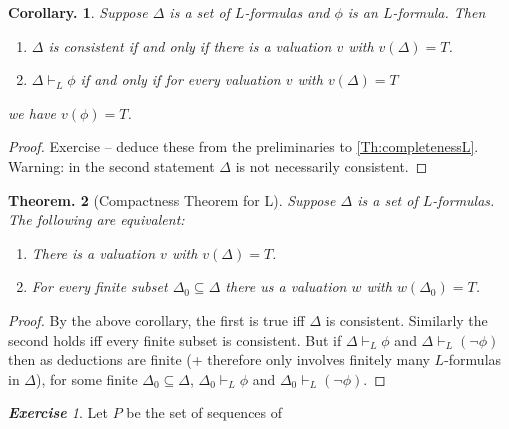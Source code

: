 \documentclass[a4paper,oneside,11pt,DIV=12,parskip=half]{scrartcl}
\theoremstyle{plain}
\newtheorem{theorem}{Theorem.}[section]
\newtheorem{corollary}[theorem]{Corollary.}
\theoremstyle{definition}
\newtheorem{remark, definition}[theorem]{Remark and Definition.}
\newtheorem{lemma, definition}[theorem]{Lemma and Definition.}
\newtheorem{theorem, definition}[theorem]{Theorem and Definition.}
\theoremstyle{remark}
\newtheorem*{exercise}{\textbf{Exercise}}
\newtheorem*{remark, example}{\textbf{Remark and Exercise}}
\begin{document}
\begin{corollary}
 Suppose $\Delta$ is a set of $L$-formulas and $\phi$ is an $L$-formula. Then
 \begin{enumerate}
     \item $\Delta$ is consistent if and only if there is a valuation $v$ with $v(\Delta) =T$.
     \item $\Delta \vdash_L \phi$ if and only if for every valuation $v$ with $v(\Delta) = T$
 \end{enumerate} we have $v(\phi) = T$.
\end{corollary}
\begin{proof}
 Exercise -- deduce these from the preliminaries to \ref{Th:completenessL}. Warning: in the second statement $\Delta$ is not necessarily consistent.
\end{proof}

\begin{theorem}[Compactness Theorem for L]
Suppose $\Delta$ is a set of $L$-formulas. The following are equivalent:
\begin{enumerate}
    \item There is a valuation $v$ with $v(\Delta) = T$.
    \item For every finite subset $\Delta_0 \subseteq \Delta$ there us a valuation $w$ with $w(\Delta_0) = T$.
\end{enumerate}
\end{theorem}

\begin{proof}
By the above corollary, the first is true iff $\Delta$ is consistent.
Similarly the second holds iff every finite subset is consistent.
But if $\Delta \vdash_L \phi$ and $\Delta \vdash_L (\lnot \phi)$ then as deductions are finite (+ therefore only involves finitely many $L$-formulas in $\Delta$), for some finite $\Delta_0 \subseteq \Delta$, $\Delta_0 \vdash_L \phi$ and $\Delta_0 \vdash_L (\lnot \phi)$.
\end{proof}

\begin{exercise}
Let $P$ be the set of sequences of 
\end{exercise}
\end{document}
